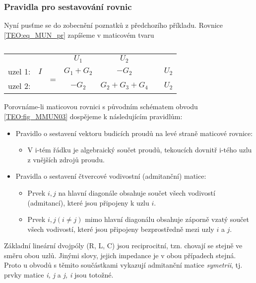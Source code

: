 {      \subsubsection{Pravidla pro sestavování rovnic}
        Nyní pusťme se do zobecnění poznatků z předchozího příkladu. Rovnice \ref{TEO:eq_MUN_pr} 
        zapíšeme v maticovém tvaru
        \begin{table}[ht!]
          \centering
          \begin{tabular}{c|c|c|c|c|c|c|}
             \multicolumn{1}{c}{}      & \multicolumn{1}{c}{}      & \multicolumn{1}{c}{} & 
             \multicolumn{1}{c}{$U_1$} & \multicolumn{1}{c}{$U_2$} & \multicolumn{1}{c}{} & 
             \multicolumn{1}{c}{}              \\
             \cline{2-2} \cline{4-5} \cline{7-7}
              uzel 1:  & $I$   & \multirow{2}{*}{=} & $G_1+G_2$ & $-G_2$         &   & $U_2$    \\
             \cline{2-2} \cline{4-5} \cline{7-7}
              uzel 2:  &       &                    & $-G_2$    & $G_2+G_3+G_4$  &   & $U_2$    \\
             \cline{2-2} \cline{4-5} \cline{7-7}
          \end{tabular}
          \caption*{ }
        \end{table}
        Porovnáme-li maticovou rovnici s původním schématem obvodu \ref{TEO:fig_MMUN03} 
        dospějeme k následujícím pravidlům:
        \begin{itemize}
         \item Pravidlo o sestavení vektoru budicích proudů na levé straně maticové rovnice:
           \begin{itemize}
             \item V $\text{i-tém}$ řádku je algebraický součet proudů, tekoucích dovnitř  
                   $\text{i-tého}$ uzlu z vnějších zdrojů proudu.
           \end{itemize}
         \item Pravidla o sestavení čtvercové vodivostní (admitanční) matice:
           \begin{itemize}
             \item Prvek $i, j$ na hlavní diagonále obsahuje součet všech vodivostí (admitancí),  
                   které jsou připojeny k uzlu $i$.
             \item Prvek $i, j (i \neq j)$ mimo hlavní diagonálu obsahuje záporně vzatý součet všech 
                   vodivostí, které jsou připojeny bezprostředně mezi uzly $i$ a $j$.
           \end{itemize}
        \end{itemize}
        Základní lineární dvojpóly (R, L, C) jsou reciprocitní, tzn. chovají se stejně ve směru 
        obou uzlů. Jinými slovy, jejich impedance je v obou případech stejná. Proto u obvodů s 
        těmito součástkami vykazují admitanční matice \emph{symetrii}, tj. prvky matice \emph{i, j} 
        a \emph{j, i} jsou totožné.

}

